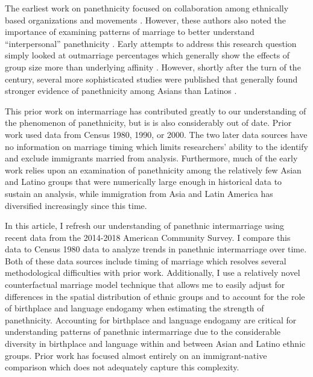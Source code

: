 \documentclass[11pt,]{article}
\begin{document}
The earliest work on panethnicity focused on collaboration among ethnically based organizations and movements \citep{lopez_panethnicity_1990, okamoto_theory_2003}. However, these authors also noted the importance of examining patterns of marriage to better understand ``interpersonal'' panethnicity \citep[pp.~167-168]{espiritu_asian_1993}. Early attempts to address this research question simply looked at outmarriage percentages which generally show the effects of group size more than underlying affinity \citep{shinagawa_asian_1996}. However, shortly after the turn of the century, several more sophisticated studies were published that generally found stronger evidence of panethnicity among Asians than Latinos \citep{qian_asian_2001, rosenfeld_salience_2001, qian_latinos_2004, fu_how_2007a, qian_crossing_2012}.

This prior work on intermarriage has contributed greatly to our understanding of the phenomenon of panethnicity, but is is also considerably out of date. Prior work used data from Census 1980, 1990, or 2000. The two later data sources have no information on marriage timing which limits researchers' ability to the identify and exclude immigrants married from analysis. Furthermore, much of the early work relies upon an examination of panethnicity among the relatively few Asian and Latino groups that were numerically large enough in historical data to sustain an analysis, while immigration from Asia and Latin America has diversified increasingly since this time.

In this article, I refresh our understanding of panethnic intermarriage using recent data from the 2014-2018 American Community Survey. I compare this data to Census 1980 data to analyze trends in panethnic intermarriage over time. Both of these data sources include timing of marriage which resolves several methodological difficulties with prior work. Additionally, I use a relatively novel counterfactual marriage model technique \citep{gullickson_counterfactual_2021} that allows me to easily adjust for differences in the spatial distribution of ethnic groups and to account for the role of birthplace and language endogamy when estimating the strength of panethnicity. Accounting for birthplace and language endogamy are critical for understanding patterns of panethnic intermarriage due to the considerable diversity in birthplace and language within and between Asian and Latino ethnic groups. Prior work has focused almost entirely on an immigrant-native comparison which does not adequately capture this complexity.
\end{document}
